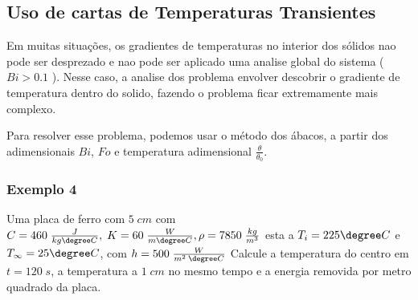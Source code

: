 \subsection{Uso de cartas de Temperaturas Transientes}
Em muitas situações, os gradientes de temperaturas no interior dos sólidos nao pode ser desprezado e
nao pode ser aplicado uma analise global do sistema ( \(Bi > 0.1\) ). Nesse caso, a analise dos
problema envolver descobrir o gradiente de temperatura dentro do solido, fazendo o problema ficar
extremamente mais complexo. \par

Para resolver esse problema, podemos usar o método dos ábacos, a partir dos adimensionais \(Bi\),
\(Fo\) e temperatura adimensional \(\frac{\theta}{\theta _0}\). \par


\subsubsection{Exemplo 4}
Uma placa de ferro com \(5 \; cm\) com \(C= 460\; \frac{J}{kg\degree C}, \; K = 60 \; \frac{W}{m
\degree C}, \rho = 7850 \; \frac{kg}{m^3}\)  esta a \(T_{i} = 225 \degree C\) e \(T_{\infty} = 25 \degree C\), com \(h = 500 \; \frac{W}{m^{2} \: \degree C}\)  
Calcule a temperatura do centro em \(t = 120 \; s\), a temperatura a \(1 \; cm\) no mesmo tempo e a
energia removida por metro quadrado da placa. \par
